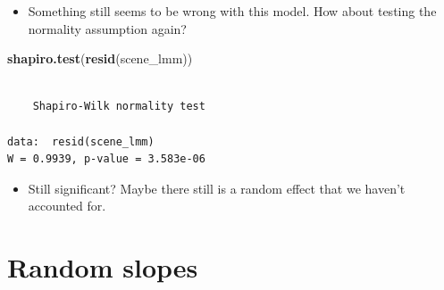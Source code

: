 \documentclass[]{article}
\newenvironment{Shaded}{}{}
\newcommand{\KeywordTok}[1]{\textcolor[rgb]{0.00,0.44,0.13}{\textbf{{#1}}}}
\newcommand{\NormalTok}[1]{{#1}}
\begin{document}
\begin{itemize}
\itemsep1pt\parskip0pt
\item
  Something still seems to be wrong with this model. How about testing
  the normality assumption again?
\end{itemize}

\begin{Shaded}
\begin{Highlighting}[]
\KeywordTok{shapiro.test}\NormalTok{(}\KeywordTok{resid}\NormalTok{(scene_lmm))}
\end{Highlighting}
\end{Shaded}

\begin{verbatim}

    Shapiro-Wilk normality test

data:  resid(scene_lmm)
W = 0.9939, p-value = 3.583e-06
\end{verbatim}

\begin{itemize}
\itemsep1pt\parskip0pt
\item
  Still significant? Maybe there still is a random effect that we
  haven't accounted for.
\end{itemize}

\section{Random slopes}\label{random-slopes}
\end{document}

